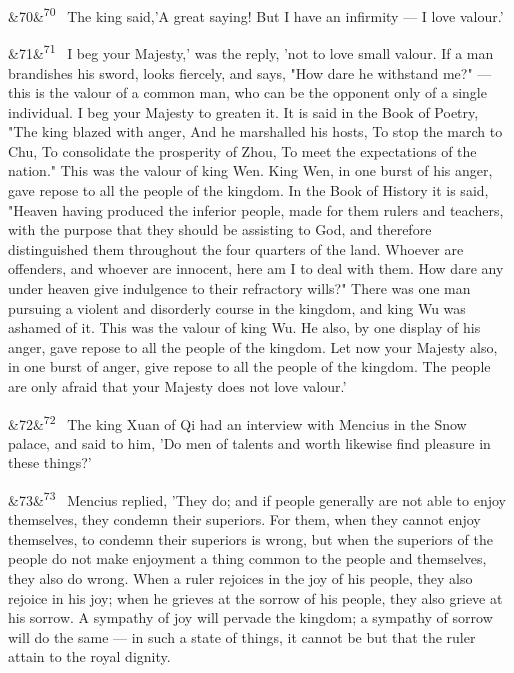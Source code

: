 \documentclass[12pt]{article}
\newcommand{\para}[1][]{\par\noindent\ifx&#1&\else\textsuperscript{\footnotesize #1}~\fi}
\begin{document}
\para[70] The king said,'A great saying! But I have an infirmity --- I love valour.'

\para[71] I beg your Majesty,' was the reply, 'not to love small valour. If a man brandishes his sword, looks fiercely, and says, "How dare he withstand me?" --- this is the valour of a common man, who can be the opponent only of a single individual. I beg your Majesty to greaten it. It is said in the Book of Poetry, "The king blazed with anger, And he marshalled his hosts, To stop the march to Chu, To consolidate the prosperity of Zhou, To meet the expectations of the nation." This was the valour of king Wen. King Wen, in one burst of his anger, gave repose to all the people of the kingdom. In the Book of History it is said, "Heaven having produced the inferior people, made for them rulers and teachers, with the purpose that they should be assisting to God, and therefore distinguished them throughout the four quarters of the land. Whoever are offenders, and whoever are innocent, here am I to deal with them. How dare any under heaven give indulgence to their refractory wills?" There was one man pursuing a violent and disorderly course in the kingdom, and king Wu was ashamed of it. This was the valour of king Wu. He also, by one display of his anger, gave repose to all the people of the kingdom. Let now your Majesty also, in one burst of anger, give repose to all the people of the kingdom. The people are only afraid that your Majesty does not love valour.'

\para[72] The king Xuan of Qi had an interview with Mencius in the Snow palace, and said to him, 'Do men of talents and worth likewise find pleasure in these things?'

\para[73] Mencius replied, 'They do; and if people generally are not able to enjoy themselves, they condemn their superiors. For them, when they cannot enjoy themselves, to condemn their superiors is wrong, but when the superiors of the people do not make enjoyment a thing common to the people and themselves, they also do wrong. When a ruler rejoices in the joy of his people, they also rejoice in his joy; when he grieves at the sorrow of his people, they also grieve at his sorrow. A sympathy of joy will pervade the kingdom; a sympathy of sorrow will do the same --- in such a state of things, it cannot be but that the ruler attain to the royal dignity.
\end{document}
